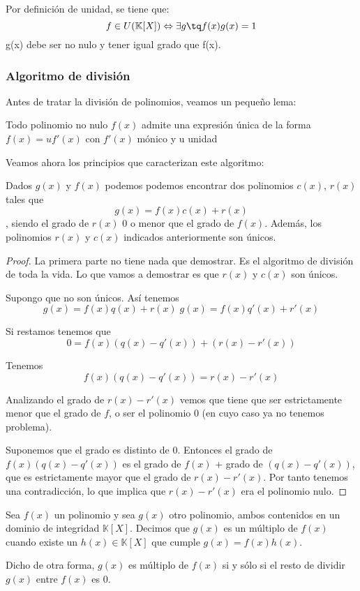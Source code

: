 \documentclass[nochap]{apuntes}
\begin{document}
Por definición de unidad, se tiene que:
\[f\in U(\mathbb{K}[X]) \Leftrightarrow \exists g \tq f(x)g(x)=1\]
g(x) debe ser no nulo y tener igual grado que f(x).

\subsubsection{Algoritmo de división}

Antes de tratar la división de polinomios, veamos un pequeño lema:

\begin{lemma}
 Todo polinomio no nulo $f(x)$ admite una expresión única de la forma $f(x)=uf'(x)$ con $f'(x)$ mónico y u unidad
\end{lemma}

Veamos ahora los principios que caracterizan este algoritmo:

\begin{lemma}
Dados $g(x)$ y $f(x)$ podemos podemos encontrar dos polinomios $c(x)$, $r(x)$ tales que \[ g(x)=f(x)c(x)+r(x) \], siendo el grado de $r(x)$ 0 o menor que el grado de $f(x)$. Además, los polinomios $r(x)$ y $c(x)$ indicados anteriormente son únicos.
\end{lemma}

\begin{proof}
La primera parte no tiene nada que demostrar. Es el algoritmo de división de toda la vida. Lo que vamos a demostrar es que $r(x)$ y $c(x)$ son únicos.

Supongo que no son únicos.
  Así tenemos \[ g(x)=f(x)q(x)+r(x)\; g(x)=f(x)q'(x)+r'(x) \]
  
  Si restamos tenemos que \[ 0=f(x)(q(x)-q'(x))+(r(x)-r'(x)) \]
  
  Tenemos \[ f(x)(q(x)-q'(x))=r(x)-r'(x) \]
  
  Analizando el grado de $r(x)-r'(x)$ vemos que tiene que ser estrictamente menor que el grado de $f$, o ser el polinomio 0 (en cuyo caso ya no tenemos problema).
  
  Suponemos que el grado es distinto de 0. Entonces el grado de $f(x)(q(x)-q'(x))$ es el grado de $f(x)$ + grado de $(q(x)-q'(x))$, que es estrictamente mayor que el grado de $r(x)-r'(x)$.  Por tanto tenemos una contradicción, lo que implica que $r(x)-r'(x)$ era el polinomio nulo.  
\end{proof}

\begin{defn}
 Sea $f(x)$ un polinomio y sea $g(x)$ otro polinomio, ambos contenidos en un dominio de integridad $\mathbb{K}[X]$. Decimos
 que $g(x)$ es un múltiplo de $f(x)$ cuando existe un $h(x)\in \mathbb{K}[X]$ que cumple $g(x)=f(x)h(x)$.
 
 Dicho de otra forma, $g(x)$ es múltiplo de $f(x)$ si y sólo si el resto de dividir $g(x)$ entre $f(x)$ es 0.
\end{defn}
\end{document}
